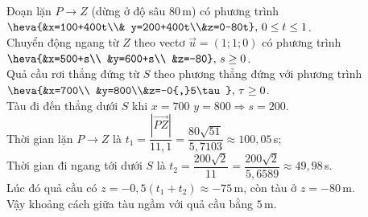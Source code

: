 \begin{bt}
{		Đoạn lặn $P\to Z$ (dừng ở độ sâu  $80$\,m) có phương trình $\heva{&x=100+400t\\& y=200+400t\\&z=0-80t},\,0\le t\le1$.\\
		Chuyển  động ngang từ $Z$ theo vectơ $\overrightarrow{u}=(1;1;0)$ có phương trình $\heva{&x=500+s\\ &y=600+s\\ &z=-80},\,s\ge0$.\\
		Quả cầu rơi thẳng đứng từ $S$ theo phương thẳng đứng với phương trình  $\heva{&x=700\\ &y=800\\&z=-0{,}5\tau},\,\tau\ge0$.\\
		Tàu đi đến thẳng dưới $S$ khi $x=700$ $y=800\Rightarrow  s=200$.\\
		Thời gian lặn  $P\to Z$ là $ t_1=\dfrac{|\overrightarrow{PZ}|}{11{,}1}=\dfrac{80\sqrt{51}}{5{,}7103}\approx100{,}05$\,s;\\
		Thời gian đi ngang tới dưới $S$ là  $ t_2=\dfrac{200\sqrt{2}}{11}=\dfrac{200\sqrt{2}}{5{,}6589}\approx49{,}98$\,s.\\
		 Lúc đó quả cầu có $z=-0{,}5(t_1+t_2)\approx-75$\,m, còn tàu ở $z=-80$\,m.\\
		Vậy khoảng cách  giữa tàu ngầm với quả cầu bằng $5$\,m.
	} 
\end{bt}

